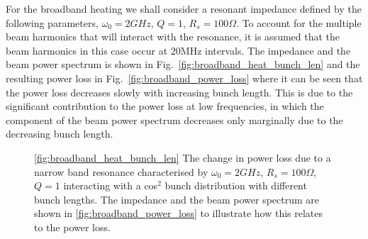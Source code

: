 For the broadband heating we shall consider a resonant impedance defined by the following parameters, $\omega_{0} = 2GHz$, $Q=1$, $R_{s}=100\Omega$. To account for the multiple beam harmonics that will interact with the resonance, it is assumed that the beam harmonics in this case occur at $20$MHz intervals. The impedance and the beam power spectrum is shown in Fig.~\ref{fig:broadband_heat_bunch_len} and the resulting power loss in Fig.~\ref{fig:broadband_power_loss} where it can be seen that the power loss decreases slowly with increasing bunch length. This is due to the significant contribution to the power loss at low frequencies, in which the component of the beam power spectrum decreases only marginally due to the decreasing bunch length.

\begin{figure}
\caption{\ref{fig:broadband_heat_bunch_len} The change in power loss due to a narrow band resonance characterised by $\omega_{0} = 2GHz$, $R_{s} = 100\Omega$, $Q = 1$ interacting with a cos$^{2}$ bunch distribution with different bunch lengths. The impedance and the beam power spectrum are shown in \ref{fig:broadband_power_loss} to illustrate how this relates to the power loss.}
\end{figure}

